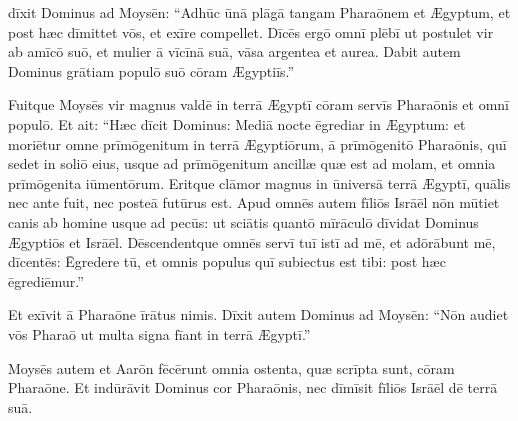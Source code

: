 

\thispagestyle{empty}

 dīxit Dominus ad Moysēn: ``Adhūc ūnā
plāgā tangam Pharaōnem et Ægyptum, et post
hæc dīmittet vōs, et exīre compellet. Dīcēs ergō omnī
plēbī ut postulet vir ab amīcō suō, et mulier ā
vīcīnā suā, vāsa argentea et aurea. Dabit autem Dominus
grātiam populō suō cōram Ægyptiīs.''

Fuitque Moysēs vir
magnus valdē in terrā Ægyptī cōram servīs Pharaōnis et omnī
populō. Et ait: ``Hæc dīcit Dominus: Mediā nocte ēgrediar in Ægyptum: 
et moriētur omne prīmōgenitum in terrā Ægyptiōrum, ā
prīmōgenitō Pharaōnis, quī sedet in soliō eius, usque ad
prīmōgenitum ancillæ quæ est ad molam, et omnia
prīmōgenita iūmentōrum. Eritque clāmor magnus
in ūniversā terrā Ægyptī, quālis nec ante fuit, nec posteā futūrus est. 
Apud omnēs autem fīliōs Isrāēl nōn mūtiet
canis ab homine usque ad pecūs: ut sciātis quantō mīrāculō
dīvidat Dominus Ægyptiōs et Isrāēl. Dēscendentque omnēs servī tuī istī ad
mē, et adōrābunt mē, dīcentēs: Ēgredere tū, et omnis populus quī
subiectus est tibi: post
hæc ēgrediēmur.''

Et exīvit ā Pharaōne īrātus nimis. Dīxit
autem Dominus ad Moysēn: ``Nōn audiet vōs Pharaō ut multa
signa fīant in terrā Ægyptī.''

Moysēs autem et Aarōn fēcērunt omnia
ostenta, quæ scrīpta sunt, cōram Pharaōne. Et indūrāvit Dominus cor Pharaōnis, nec dīmīsit fīliōs Isrāēl dē terrā
suā. 
